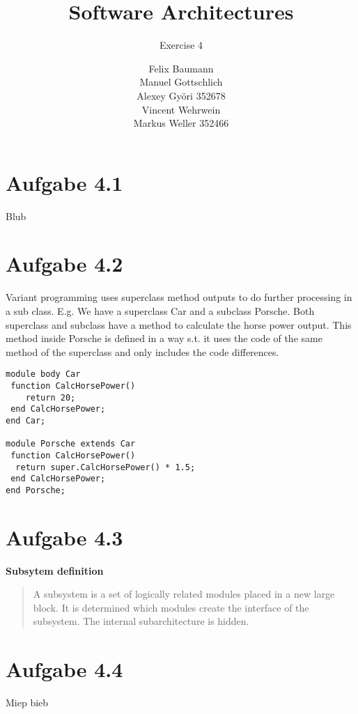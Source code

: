 \documentclass[a4paper,10pt]{scrartcl}[2003/01/01]
\title{Software Architectures}
\subtitle{Exercise 4}
\author{ Felix Baumann \\ Manuel Gottschlich \\  Alexey Gy\"ori 352678 \\ Vincent Wehrwein \\ Markus Weller 352466}
\begin{document}
    \maketitle
    \section*{Aufgabe 4.1}
Blub
    \section*{Aufgabe 4.2}
Variant programming uses superclass method outputs to do further processing in a sub class. E.g. We have a superclass Car and a subclass Porsche. Both superclass and subclass have a method to calculate the horse power output. This method inside Porsche is defined in a way s.t. it uses the code of the same method of the superclass and only includes the code differences.

\begin{verbatim}
module body Car 
 function CalcHorsePower() 
 	return 20;
 end CalcHorsePower;
end Car;

module Porsche extends Car 
 function CalcHorsePower()
  return super.CalcHorsePower() * 1.5;
 end CalcHorsePower;
end Porsche;
\end{verbatim}
    \section*{Aufgabe 4.3}
    
    \textbf{Subsytem definition}
\begin{quote}
A subsystem is a set of logically related modules placed in a new large block. It is determined which modules create the interface of the subsystem. The internal subarchitecture is hidden.
   
\end{quote}
   
    \section*{Aufgabe 4.4}
Miep bieb
\end{document}
